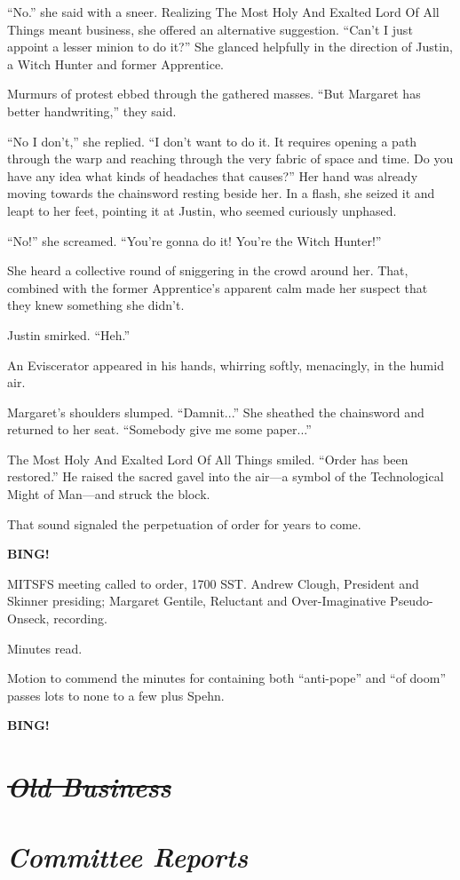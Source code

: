 \documentclass[10pt]{article}
\newcommand{\bing}{{\bf BING!} }
\newcommand{\goto}[1]{\bing \vskip 12pt \section*{{\em{#1}}}}
\newcommand{\ps}{ plus Spehn\xspace}
\begin{document}
``No.'' she said with a sneer. Realizing The Most Holy And Exalted Lord Of All Things meant 
business, she offered an alternative suggestion. ``Can't I just appoint a lesser minion to do 
it?'' She glanced helpfully in the direction of Justin, a Witch Hunter and former Apprentice. 

Murmurs of protest ebbed through the gathered masses. ``But Margaret has better handwriting,'' they said.

``No I don't,'' she replied. ``I don't want to do it. It requires opening a path through the warp 
and reaching through the very fabric of space and time.  Do you have any idea what kinds of 
headaches that causes?'' Her hand was already moving towards the chainsword resting beside her. In 
a flash, she seized it and leapt to her feet, pointing it at Justin, who seemed curiously unphased.

``No!'' she screamed. ``You're gonna do it! You're the Witch Hunter!''

She heard a collective round of sniggering in the crowd around her.  That, combined with the former 
Apprentice's apparent calm made her suspect that they knew something she didn't.

Justin smirked. ``Heh.'' 

An Eviscerator appeared in his hands, whirring softly, menacingly, in the humid air.

Margaret's shoulders slumped. ``Damnit...'' She sheathed the chainsword and returned to her seat.
``Somebody give me some paper...''

 The Most Holy And Exalted Lord Of All Things smiled. ``Order has been restored.''  He raised the 
sacred gavel into the air---a symbol of the Technological Might of Man---and struck the block. 

That sound signaled the perpetuation of order for years to come.

\bing

MITSFS meeting called to order, 1700 SST. Andrew Clough, President and Skinner presiding; Margaret 
Gentile, Reluctant and Over-Imaginative Pseudo-Onseck, recording.

Minutes read.

Motion to commend the minutes for containing both ``anti-pope'' and ``of doom'' passes lots to none 
to a few \ps.

\goto{\sout{Old Business}}

\vskip 12pt \section*{{\em{Committee Reports}}}
\end{document}
